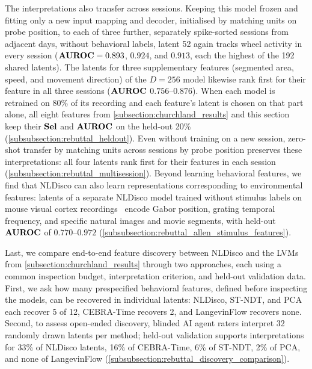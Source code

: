 The interpretations also transfer across sessions. Keeping this model frozen and fitting only a new input mapping and decoder, initialised by matching units on probe position, to each of three further, separately spike-sorted sessions from adjacent days, without behavioral labels, latent 52 again tracks wheel activity in every session ($\mathbf{AUROC}=0.893$, $0.924$, and $0.913$, each the highest of the 192 shared latents). The latents for three supplementary features (segmented area, speed, and movement direction) of the $D=256$ model likewise rank first for their feature in all three sessions ($\mathbf{AUROC}$ $0.756$--$0.876$). When each model is retrained on 80\% of its recording and each feature's latent is chosen on that part alone, all eight features from \hyperref[subsection:churchland_results]{\ref*{subsection:churchland_results}} and this section keep their $\mathbf{Sel}$ and $\mathbf{AUROC}$ on the held-out 20\% (\hyperref[subsubsection:rebuttal_heldout]{\ref*{subsubsection:rebuttal_heldout}}). Even without training on a new session, zero-shot transfer by matching units across sessions by probe position preserves these interpretations: all four latents rank first for their features in each session (\hyperref[subsubsection:rebuttal_multisession]{\ref*{subsubsection:rebuttal_multisession}}). Beyond learning behavioral features, we find that NLDisco can also learn representations corresponding to environmental features: latents of a separate NLDisco model trained without stimulus labels on mouse visual cortex recordings~\citep{siegle_2021_allen_datasets} encode Gabor position, grating temporal frequency, and specific natural images and movie segments, with held-out $\mathbf{AUROC}$ of $0.770$--$0.972$ (\hyperref[subsubsection:rebuttal_allen_stimulus_features]{\ref*{subsubsection:rebuttal_allen_stimulus_features}}).

Last, we compare end-to-end feature discovery between NLDisco and the LVMs from \hyperref[subsection:churchland_results]{\ref*{subsection:churchland_results}} through two approaches, each using a common inspection budget, interpretation criterion, and held-out validation data. First, we ask how many prespecified behavioral features, defined before inspecting the models, can be recovered in individual latents: NLDisco, ST-NDT, and PCA each recover 5 of 12, CEBRA-Time recovers 2, and LangevinFlow recovers none. Second, to assess open-ended discovery, blinded AI agent raters interpret 32 randomly drawn latents per method; held-out validation supports interpretations for 33\% of NLDisco latents, 16\% of CEBRA-Time, 6\% of ST-NDT, 2\% of PCA, and none of LangevinFlow (\hyperref[subsubsection:rebuttal_discovery_comparison]{\ref*{subsubsection:rebuttal_discovery_comparison}}).

